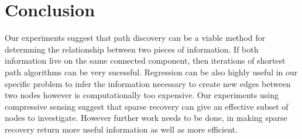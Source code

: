 \documentclass{article} %
\begin{document}
\section{Conclusion}
Our experiments suggest that path discovery can be a viable method for determning the relationship between two pieces of information.
If both information live on the same connected component, then iterations of shortest path algorithms can be very sucessful.
Regression can be also highly useful in our specific problem to infer the information necessary to create new edges between two nodes however is computationally too expensive. Our experiments using compressive sensing suggest that sparse recovery can give an effective subset of nodes to investigate.
However further work needs to be done, in making sparse recovery return more useful information as well as more efficient.
\end{document}
